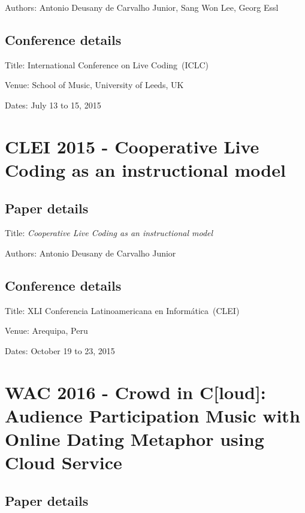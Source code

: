 Authors: Antonio Deusany de Carvalho Junior, Sang Won Lee, Georg Essl

\subsection*{Conference details}

Title: International Conference on Live Coding~(ICLC)

Venue: School of Music, University of Leeds, UK

Dates: July 13 to 15, 2015



\section{CLEI 2015 - Cooperative Live Coding as an instructional model}
\label{ape:paperclei2015}

\subsection*{Paper details}

Title: \textit{Cooperative Live Coding as an instructional model}

Authors: Antonio Deusany de Carvalho Junior

\subsection*{Conference details}

Title: XLI Conferencia Latinoamericana en Informática~(CLEI)

Venue: Arequipa, Peru

Dates: October 19 to 23, 2015



\section{WAC 2016 - Crowd in C[loud]: Audience Participation Music with Online Dating Metaphor using Cloud Service}
\label{ape:paperwac2016}

\subsection*{Paper details}

